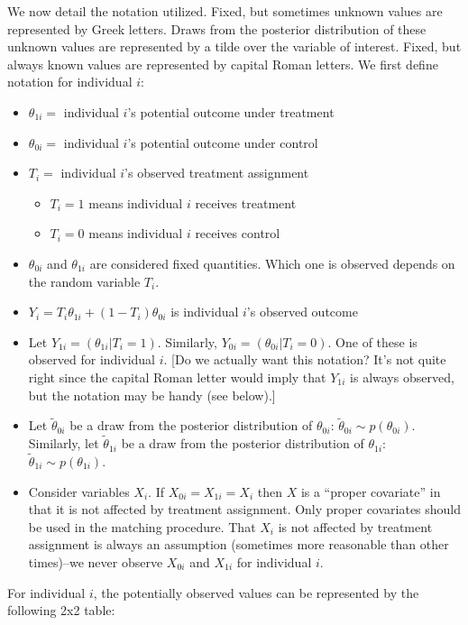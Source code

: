 \documentclass[oneside,letterpaper,titlepage,12pt]{article}
\begin{document}
We now detail the notation utilized.  Fixed, but sometimes unknown values are represented by Greek letters.  Draws from the posterior
distribution of these unknown values are represented by a tilde over the variable of interest.  Fixed, but always known values are represented
by capital Roman letters.
We first define notation for individual $i$:
\begin{itemize}
\item $\theta_{1i}=$ individual $i$'s potential outcome under treatment 
\item $\theta_{0i}=$ individual $i$'s potential outcome under control
\item $T_i=$ individual $i$'s observed treatment assignment 
\begin{itemize} \item $T_i=1$ means individual $i$ receives treatment
		\item $T_i=0$ means individual $i$ receives control
\end{itemize}
\item $\theta_{0i}$ and $\theta_{1i}$ are considered fixed quantities.  Which one is observed depends on the random variable $T_i$.
\item $Y_i=T_i \theta_{1i} + (1-T_i) \theta_{0i}$ is individual $i$'s observed outcome
\item Let $Y_{1i}=(\theta_{1i}|T_i=1)$.  Similarly, $Y_{0i}=(\theta_{0i}|T_i=0)$.  One of these is observed for individual $i$.  [Do we actually want this
notation?  It's not quite right since the capital Roman letter would imply that $Y_{1i}$ is always observed, but the notation may be handy (see below).]
\item Let $\tilde{\theta}_{0i}$ be a draw from the posterior distribution of $\theta_{0i}$: $\tilde{\theta}_{0i} \sim p(\theta_{0i})$. 
Similarly, let  $\tilde{\theta}_{1i}$ be a draw from the posterior distribution of $\theta_{1i}$: $\tilde{\theta}_{1i} \sim p(\theta_{1i})$.
\item Consider variables $X_i$.  If $X_{0i}=X_{1i}=X_i$ then $X$ is a ``proper covariate'' in that it is not affected by treatment assignment.  Only proper
covariates should be used in the matching procedure.  That $X_i$ is not affected by treatment assignment 
is always an assumption (sometimes more reasonable than other times)--we never observe $X_{0i}$ and $X_{1i}$ for individual $i$.
\end{itemize}

For individual $i$, the potentially observed values can be represented by the following 2x2 table:
\end{document}
